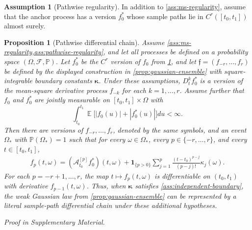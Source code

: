 \documentclass[11pt,a4paper]{article}
\newtheorem{proposition}{Proposition}
\theoremstyle{definition}
\newtheorem{assumption}{Assumption}
\theoremstyle{remark}
\newenvironment{mainproposition}[1][]{\begin{proposition}[#1]}{\par\noindent\emph{Proof in Supplementary Material.}\end{proposition}}
\DeclareMathOperator{\E}{\mathbb{E}}
\begin{document}
\begin{assumption}[Pathwise regularity]\label{ass:pathwise-regularity}
In addition to \cref{ass:ms-regularity}, assume that the anchor process has a version \(f_0^\ast\) whose sample paths lie in \(C^r([t_0, t_1])\) almost surely.
\end{assumption}


\begin{mainproposition}[Pathwise differential chain]\label{prop:samplepaths}
Assume \cref{ass:ms-regularity,ass:pathwise-regularity}, and let all processes be defined on a probability space \((\Omega,\mathcal F,\mathbb P)\). Let \(f_0^\ast\) be the \(C^r\) version of \(f_0\) from \cref{ass:pathwise-regularity}, and let \(\mathfrak f=(f_{-r},\ldots,f_r)\) be defined by the displayed construction in \cref{prop:gaussian-ensemble} with square-integrable boundary constants \(\boldsymbol\kappa\). Under these assumptions, \(D_t^k f_0^\ast\) is a version of the mean-square derivative process \(f_{-k}\) for each \(k=1,\ldots,r\). Assume further that \(f_0\) and \(f_0^\ast\) are jointly measurable on \([t_0,t_1]\times\Omega\) with
\[
\int_{t_0}^{t_1}\E\bigl[|f_0(u)|+|f_0^\ast(u)|\bigr]du<\infty.
\]
Then there are versions of \(f_{-r},\ldots,f_r\), denoted by the same symbols, and an event \(\Omega_\ast\) with \(\mathbb P(\Omega_\ast)=1\) such that for every \(\omega\in\Omega_\ast\), every \(p\in\{-r,\ldots,r\}\), and every \(t\in[t_0,t_1]\),
\begin{align*}
f_p(t,\omega)=(\mathcal A_{t_0}^{[p]}f_0^\ast)(t,\omega)+\mathbf 1_{\{p>0\}}\sum_{j=1}^{p}\frac{(t-t_0)^{p-j}}{(p-j)!}\kappa_j(\omega).
\end{align*}
For each \(p=-r+1,\ldots,r\), the map \(t\mapsto f_p(t,\omega)\) is differentiable on \((t_0,t_1)\) with derivative \(f_{p-1}(t,\omega)\). Thus, when \(\boldsymbol\kappa\) satisfies \cref{ass:independent-boundary}, the weak Gaussian law from \cref{prop:gaussian-ensemble} can be represented by a literal sample-path differential chain under these additional hypotheses.
\end{mainproposition}
\end{document}
